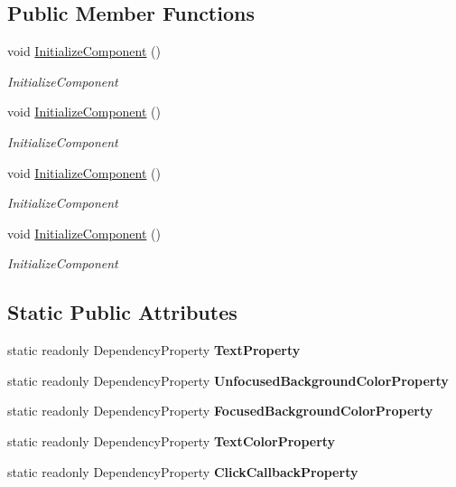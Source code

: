 \subsection*{Public Member Functions}
\begin{DoxyCompactItemize}
\item 
void \mbox{\hyperlink{class_teacher_handbook_1_1_controls_1_1_catalog_button_a930173b42b66bb6370c3ac8cf0e1882b}{Initialize\+Component}} ()
\begin{DoxyCompactList}\small\item\em Initialize\+Component \end{DoxyCompactList}\item 
void \mbox{\hyperlink{class_teacher_handbook_1_1_controls_1_1_catalog_button_a930173b42b66bb6370c3ac8cf0e1882b}{Initialize\+Component}} ()
\begin{DoxyCompactList}\small\item\em Initialize\+Component \end{DoxyCompactList}\item 
void \mbox{\hyperlink{class_teacher_handbook_1_1_controls_1_1_catalog_button_a930173b42b66bb6370c3ac8cf0e1882b}{Initialize\+Component}} ()
\begin{DoxyCompactList}\small\item\em Initialize\+Component \end{DoxyCompactList}\item 
void \mbox{\hyperlink{class_teacher_handbook_1_1_controls_1_1_catalog_button_a930173b42b66bb6370c3ac8cf0e1882b}{Initialize\+Component}} ()
\begin{DoxyCompactList}\small\item\em Initialize\+Component \end{DoxyCompactList}\end{DoxyCompactItemize}
\subsection*{Static Public Attributes}
\begin{DoxyCompactItemize}
\item 
static readonly Dependency\+Property {\bfseries Text\+Property}
\item 
static readonly Dependency\+Property {\bfseries Unfocused\+Background\+Color\+Property}
\item 
static readonly Dependency\+Property {\bfseries Focused\+Background\+Color\+Property}
\item 
static readonly Dependency\+Property {\bfseries Text\+Color\+Property}
\item 
static readonly Dependency\+Property {\bfseries Click\+Callback\+Property}
\end{DoxyCompactItemize}
